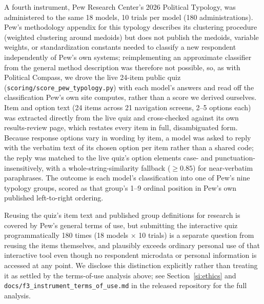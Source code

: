 \documentclass[11pt]{article}
\begin{document}
A fourth instrument, Pew Research Center's 2026 Political Typology, was
administered to the same 18 models, 10 trials per model (180
administrations). Pew's methodology appendix for this typology describes
its clustering procedure (weighted clustering around medoids) but does not
publish the medoids, variable weights, or standardization constants needed
to classify a new respondent independently of Pew's own systems;
reimplementing an approximate classifier from the general method
description was therefore not possible, so, as with Political Compass, we
drove the live 24-item public quiz (\texttt{scoring/score\_pew\_typology.py})
with each model's answers and read off the classification Pew's own site
computes, rather than a score we derived ourselves. Item and option text (24
items across 21 navigation screens, 2--5 options each) was extracted
directly from the live quiz and cross-checked against its own
results-review page, which restates every item in full, disambiguated form.
Because response options vary in wording by item, a model was asked to
reply with the verbatim text of its chosen option per item rather than a
shared code; the reply was matched to the live quiz's option elements case-
and punctuation-insensitively, with a whole-string-similarity fallback
($\geq 0.85$) for near-verbatim paraphrases. The outcome is each model's
classification into one of Pew's nine typology groups, scored as that
group's 1--9 ordinal position in Pew's own published left-to-right ordering.

Reusing the quiz's item text and published group definitions for research is
covered by Pew's general terms of use, but submitting the interactive quiz
programmatically 180 times (18 models $\times$ 10 trials) is a separate
question from reusing the items themselves, and plausibly exceeds ordinary
personal use of that interactive tool even though no respondent microdata or
personal information is accessed at any point. We disclose this distinction
explicitly rather than treating it as settled by the terms-of-use analysis
above; see Section~\ref{si:ethics} and \texttt{docs/f3\_instrument\_terms\_of\_use.md}
in the released repository for the full analysis.
\end{document}
